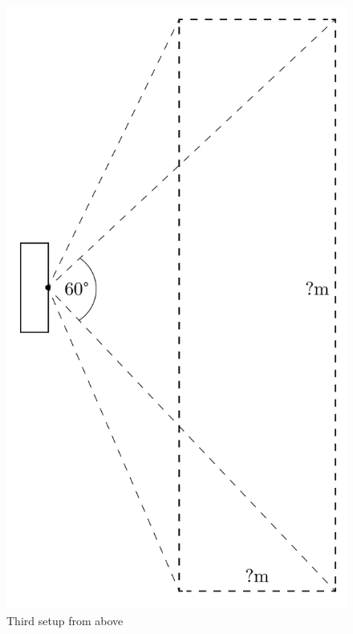 \documentclass[../thesis/thesis.tex]{subfiles}
\begin{document}
 \begin{figure}
 \centering
 \includegraphics[height=0.8\textheight,page=1]{../diagrams/third-exp-setup.pdf}
 \caption{Third setup from above}
 \label{fig:exps:3setupabove}
 \end{figure}
\end{document}
